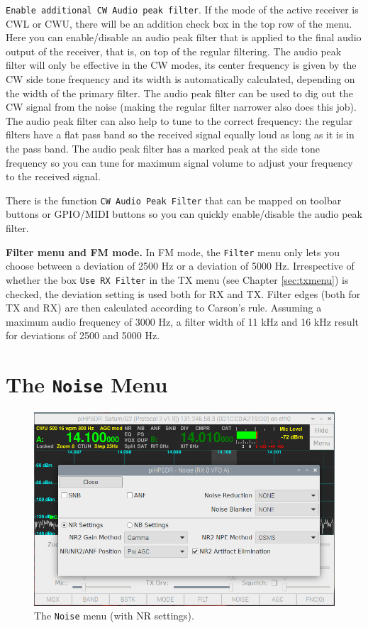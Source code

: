 \documentclass[12pt]{book}
\def\rett#1{\texttt{\color{red}#1}}
\def\bltt#1{\texttt{\color{blue}#1}}
\begin{document}
\rett{Enable additional CW Audio peak filter}. If the mode of the
active receiver is CWL or CWU, there will be an addition check box in the
top row of the menu. Here you can enable/disable an audio peak filter that
is applied to the final audio output of the receiver, that is, on top of
the regular filtering. The audio peak filter will only be effective in
the CW modes, its center frequency is given by the CW side tone frequency
and its width is automatically calculated, depending on the
width of the primary filter. The audio peak filter can be used to dig out
the CW signal from the noise (making the regular filter narrower also
does this job). The audio peak filter can also help to tune to the correct
frequency: the regular filters have a flat pass band so the received
signal equally loud as long as it is in the pass band. The audio peak filter
has a marked peak at the side tone frequency so you can tune for maximum
signal volume to adjust your frequency to the received signal.

There is the function \bltt{CW Audio Peak Filter} that can be mapped on toolbar
buttons or GPIO/MIDI buttons so you can quickly enable/disable the audio peak
filter.

\textbf{Filter menu and FM mode.} In FM mode, the \bltt{Filter} menu only lets you
choose between a deviation of 2500 Hz or a deviation of 5000 Hz.
Irrespective of whether the box \rett{Use RX Filter} in the TX menu (see
Chapter \ref{sec:txmenu}) is checked, the deviation setting is used both for RX and TX.
Filter edges (both for
TX and RX) are then calculated according to Carson's rule. Assuming a maximum audio
frequency of 3000 Hz, a filter width of 11 kHz and 16 kHz result for deviations of 2500
and 5000 Hz.

\section{The \texttt{Noise} Menu}

\begin{figure}[ht]
\center
\includegraphics[width=12cm]{NoiseMenu1.png}
\caption{The \bltt{Noise} menu (with NR settings).}
\label{fig:NoiseMenu1}
\end{figure}
\end{document}
